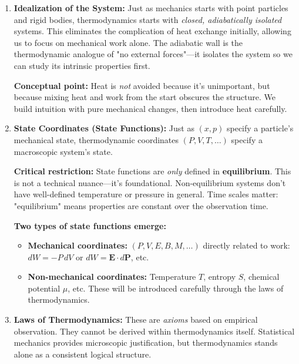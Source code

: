 \documentclass[9pt,twocoloumn]{article}
\begin{document}
\begin{enumerate}
    \item \textbf{Idealization of the System:} Just as mechanics starts with point particles and rigid bodies, thermodynamics starts with \emph{closed, adiabatically isolated} systems. This eliminates the complication of heat exchange initially, allowing us to focus on mechanical work alone. The adiabatic wall is the thermodynamic analogue of "no external forces"—it isolates the system so we can study its intrinsic properties first.

    \textbf{Conceptual point:} Heat is \emph{not} avoided because it's unimportant, but because mixing heat and work from the start obscures the structure. We build intuition with pure mechanical changes, then introduce heat carefully.

    \item \textbf{State Coordinates (State Functions):} Just as $(x, p)$ specify a particle's mechanical state, thermodynamic coordinates $(P, V, T, \ldots)$ specify a macroscopic system's state.

    \textbf{Critical restriction:} State functions are \emph{only} defined in \textbf{equilibrium}. This is not a technical nuance—it's foundational. Non-equilibrium systems don't have well-defined temperature or pressure in general. Time scales matter: "equilibrium" means properties are constant over the observation time.

    \textbf{Two types of state functions emerge:}
    \begin{itemize}
        \item \textbf{Mechanical coordinates:} $(P, V, E, B, M, \ldots)$ directly related to work: $dW = -P\,dV$ or $dW = \mathbf{E} \cdot d\mathbf{P}$, etc.
        \item \textbf{Non-mechanical coordinates:} Temperature $T$, entropy $S$, chemical potential $\mu$, etc. These will be introduced carefully through the laws of thermodynamics.
    \end{itemize}

    \item \textbf{Laws of Thermodynamics:} These are \emph{axioms} based on empirical observation. They cannot be derived within thermodynamics itself. Statistical mechanics provides microscopic justification, but thermodynamics stands alone as a consistent logical structure.
\end{enumerate}
\end{document}
